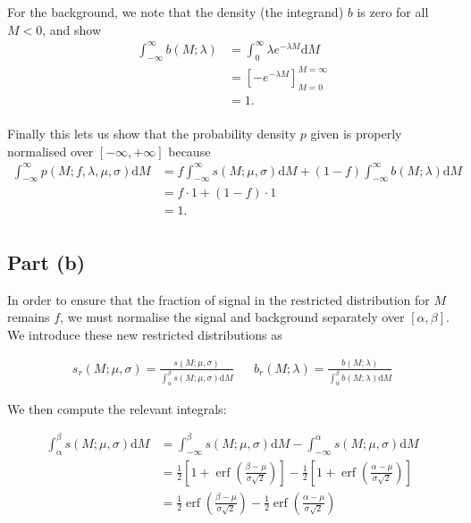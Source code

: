 \documentclass[12pt]{article}
\DeclareMathOperator{\erf}{erf}
\begin{document}
For the background, we note that the density (the integrand) $b$ is zero for all $M<0$, and show
\begin{align*}
    \int_{-\infty}^\infty b(M;\lambda) & = \int_0^\infty \lambda e^{-\lambda M}\mathrm{d}M \\
    & = \left[-e^{-\lambda M}\right]_{M=0}^{M=\infty} \\
    & = 1. \\
\end{align*}

Finally this lets us show that the probability density $p$ given is properly normalised over $[-\infty,+\infty]$ because
\begin{align*}
    \int_{-\infty}^\infty p(M; f,\lambda,\mu,\sigma)\mathrm{d}M & = f\int_{-\infty}^\infty s(M;\mu, \sigma)\mathrm{d}M + (1-f)\int_{-\infty}^\infty b(M;\lambda)\mathrm{d}M \\
    & = f\cdot 1 + (1-f)\cdot 1\\
    & = 1. \\
\end{align*}

\subsection*{Part (b)}

In order to ensure that the fraction of signal in the restricted distribution for $M$ remains $f$, we must normalise the signal and background separately over $[\alpha,\beta]$. We introduce these new restricted distributions as

\begin{align*}
    s_r(M;\mu,\sigma) = \frac{s(M;\mu,\sigma)}{\int_\alpha^\beta s(M;\mu,\sigma)\mathrm{d}M} && b_r(M;\lambda) = \frac{b(M;\lambda)}{\int_\alpha^\beta b(M;\lambda)\mathrm{d}M}
\end{align*}

We then compute the relevant integrals:

\begin{align*}
    \int_\alpha^\beta s(M;\mu,\sigma)\mathrm{d}M & = \int_{-\infty}^\beta s(M;\mu,\sigma)\mathrm{d}M - \int_{-\infty}^\alpha s(M;\mu,\sigma)\mathrm{d}M \\
    & = \frac{1}{2}\left[1 + \erf\left(\frac{\beta - \mu}{\sigma\sqrt{2}}\right)\right] - \frac{1}{2}\left[1 + \erf\left(\frac{\alpha - \mu}{\sigma\sqrt{2}}\right)\right] \\
    & = \frac{1}{2}\erf\left(\frac{\beta - \mu}{\sigma\sqrt{2}}\right) - \frac{1}{2}\erf\left(\frac{\alpha - \mu}{\sigma\sqrt{2}}\right)
\end{align*}
\end{document}
